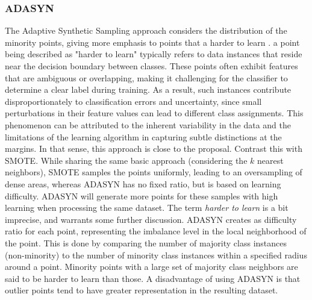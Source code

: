 \documentclass[letterpaper]{report}
\begin{document}
\subsubsection{ADASYN}
\label{section:adasyn}
The Adaptive Synthetic Sampling approach considers the distribution of the minority points, giving more emphasis to points that a harder to learn \parencite{He2008-xr}. a point being described as "harder to learn" typically refers to data instances that reside near the decision boundary between classes. These points often exhibit features that are ambiguous or overlapping, making it challenging for the classifier to determine a clear label during training. As a result, such instances contribute disproportionately to classification errors and uncertainty, since small perturbations in their feature values can lead to different class assignments. This phenomenon can be attributed to the inherent variability in the data and the limitations of the learning algorithm in capturing subtle distinctions at the margins. In that sense, this approach is close to the  proposal. Contrast this with SMOTE. While sharing the same basic approach (considering the $k$ nearest neighbors), SMOTE samples the points uniformly, leading to an oversampling of dense areas, whereas ADASYN has no fixed ratio, but is based on learning difficulty. ADASYN will generate more points for these samples with high learning when processing the same dataset. The term \textit{harder to learn} is a bit imprecise, and warrants some further discussion. ADASYN creates as difficulty ratio for each point, representing the imbalance level in the local neighborhood of the point. This is done by comparing the number of majority class instances (non-minority) to the number of minority class instances within a specified radius around a point. Minority points with a large set of majority class neighbors are said to be harder to learn than those. A disadvantage of using ADASYN is that outlier points tend to have greater representation in the resulting dataset.
\end{document}
